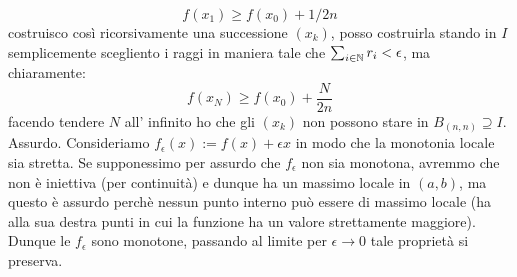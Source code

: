 $$ f(x_1)\geq f(x_0)+1/2n $$
costruisco così ricorsivamente una successione $(x_k)$, posso costruirla stando in $I$ semplicemente scegliento i raggi in maniera tale che $\sum_{i\in \mathbb{N}} r_i<\epsilon$, ma chiaramente:
$$ f(x_N)\geq f(x_0)+\frac{N}{2n} $$
facendo tendere $N$ all' infinito ho che gli $(x_k)$ non possono stare in $B_{(n,n)}\supseteq I$. Assurdo.
 Consideriamo $f_\epsilon(x):=f(x)+\epsilon x$ in modo che la monotonia locale sia stretta. Se supponessimo per assurdo che $f_\epsilon$ non sia monotona, avremmo che non è iniettiva (per continuità) e dunque ha un massimo locale in $(a,b)$, ma questo è assurdo perchè nessun punto interno può essere di massimo locale (ha alla sua destra punti in cui la funzione ha un valore strettamente maggiore). Dunque le $f_\epsilon$ sono monotone, passando al limite per $\epsilon\rightarrow 0$ tale proprietà si preserva.

